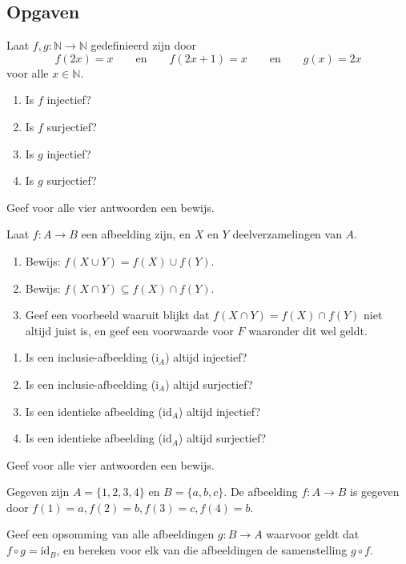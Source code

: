 \subsection{Opgaven}
\begin{exercise}[Optioneel]
Laat $f,g:\mathbb{N}\rightarrow\mathbb{N}$ gedefinieerd zijn door
$$f(2x)=x\qquad\text{en}\qquad f(2x+1)=x\qquad\text{en}\qquad g(x)=2x$$
voor alle $x\in\mathbb{N}$.
\begin{enumerate}[label=\alph*.]
    \item Is $f$ injectief?
    \item Is $f$ surjectief?
    \item Is $g$ injectief?
    \item Is $g$ surjectief?
\end{enumerate}
Geef voor alle vier antwoorden een bewijs.
\end{exercise}

\begin{exercise}[Optioneel]
Laat $f:A\rightarrow B$ een afbeelding zijn, en $X$ en $Y$ deelverzamelingen van $A$.
\begin{enumerate}[label=\alph*.]
    \item Bewijs: $f(X\cup Y)=f(X)\cup f(Y)$.
    \item Bewijs: $f(X\cap Y)\subseteq f(X)\cap f(Y)$.
    \item Geef een voorbeeld waaruit blijkt dat $f(X\cap Y)=f(X)\cap f(Y)$ niet altijd juist is, en geef een voorwaarde voor $F$ waaronder dit wel geldt.
\end{enumerate}
\end{exercise}

\begin{exercise}[Optioneel]
\begin{enumerate}[label=\alph*.]
    \item Is een inclusie-afbeelding ($\text{i}_A$) altijd injectief?
    \item Is een inclusie-afbeelding ($\text{i}_A$) altijd surjectief?
    \item Is een identieke afbeelding ($\text{id}_A$) altijd injectief?
    \item Is een identieke afbeelding ($\text{id}_A$) altijd surjectief?
\end{enumerate}
Geef voor alle vier antwoorden een bewijs.
\end{exercise}

\begin{exercise}[Optioneel]
Gegeven zijn $A=\{1,2,3,4\}$ en $B=\{a,b,c\}$. De afbeelding $f:A\rightarrow B$ is gegeven door $f(1)=a, f(2)=b, f(3)=c, f(4)=b$.

Geef een opsomming van alle afbeeldingen $g: B\rightarrow A$ waarvoor geldt dat $f\circ g = \text{id}_B$, en bereken voor elk van die afbeeldingen de samenstelling $g\circ f$.
\end{exercise}

